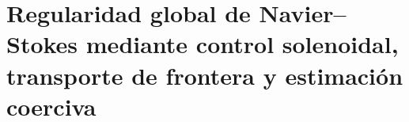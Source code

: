 \HMTFlushCurrentChapter
\chapter{Regularidad global de Navier--Stokes mediante control solenoidal, transporte de frontera y estimación coerciva}
\begingroup
\renewcommand{\chapter}[2][]{}%

\endgroup

\HMTFlushCurrentChapter
\chapter{Existencia cuántica y brecha de masa de Yang--Mills mediante coercividad de calibre y positividad espectral}
\begingroup
\renewcommand{\chapter}[2][]{}%

\endgroup


\HMTFlushCurrentChapter
\chapter{Realización algebraica de clases de Hodge mediante proyectores cohomológicos compatibles y descenso racional}
\begingroup
\renewcommand{\chapter}[2][]{}%

\endgroup

\HMTFlushCurrentChapter
\chapter{Rango, regulador y término principal de Birch--Swinnerton--Dyer mediante memoria determinantal de la familia aritmética}
\begingroup
\renewcommand{\chapter}[2][]{}%

\endgroup

